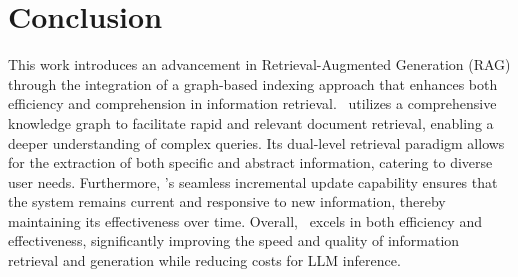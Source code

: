 \section{Conclusion}\vspace{-0.1in}
\label{sec:conclusion}

This work introduces an advancement in Retrieval-Augmented Generation (RAG) through the integration of a graph-based indexing approach that enhances both efficiency and comprehension in information retrieval. \model\ utilizes a comprehensive knowledge graph to facilitate rapid and relevant document retrieval, enabling a deeper understanding of complex queries. Its dual-level retrieval paradigm allows for the extraction of both specific and abstract information, catering to diverse user needs. Furthermore, \model's seamless incremental update capability ensures that the system remains current and responsive to new information, thereby maintaining its effectiveness over time. Overall, \model\ excels in both efficiency and effectiveness, significantly improving the speed and quality of information retrieval and generation while reducing costs for LLM inference.